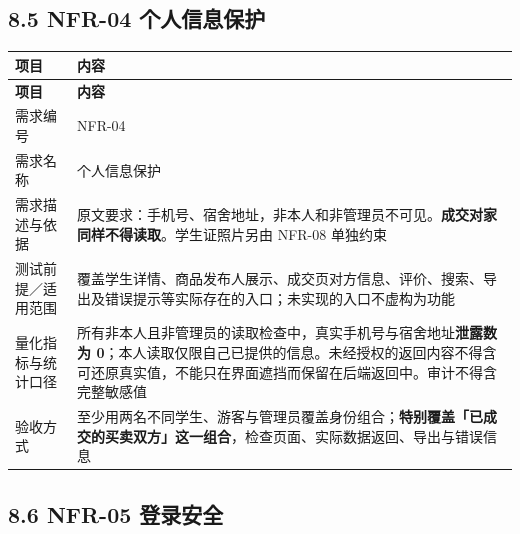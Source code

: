 \documentclass[12pt,a4paper]{ctexart}
\begin{document}
\subsection*{8.5 NFR-04 个人信息保护}

{\footnotesize
\begin{longtable}{|p{2.75cm}|p{13.25cm}|}
\hline
\textbf{项目} & \textbf{内容} \\
\hline
\endfirsthead
\hline
\textbf{项目} & \textbf{内容} \\
\hline
\endhead
\hline
\endfoot
需求编号 & NFR-04 \\
\hline
需求名称 & 个人信息保护 \\
\hline
需求描述与依据 & 原文要求：手机号、宿舍地址，非本人和非管理员不可见。\textbf{成交对家同样不得读取}。学生证照片另由 NFR-08 单独约束 \\
\hline
测试前提／适用范围 & 覆盖学生详情、商品发布人展示、成交页对方信息、评价、搜索、导出及错误提示等实际存在的入口；未实现的入口不虚构为功能 \\
\hline
量化指标与统计口径 & 所有非本人且非管理员的读取检查中，真实手机号与宿舍地址\textbf{泄露数为 0}；本人读取仅限自己已提供的信息。未经授权的返回内容不得含可还原真实值，不能只在界面遮挡而保留在后端返回中。审计不得含完整敏感值 \\
\hline
验收方式 & 至少用两名不同学生、游客与管理员覆盖身份组合；\textbf{特别覆盖「已成交的买卖双方」这一组合}，检查页面、实际数据返回、导出与错误信息 \\
\hline
\end{longtable}
}


\subsection*{8.6 NFR-05 登录安全}
\end{document}
